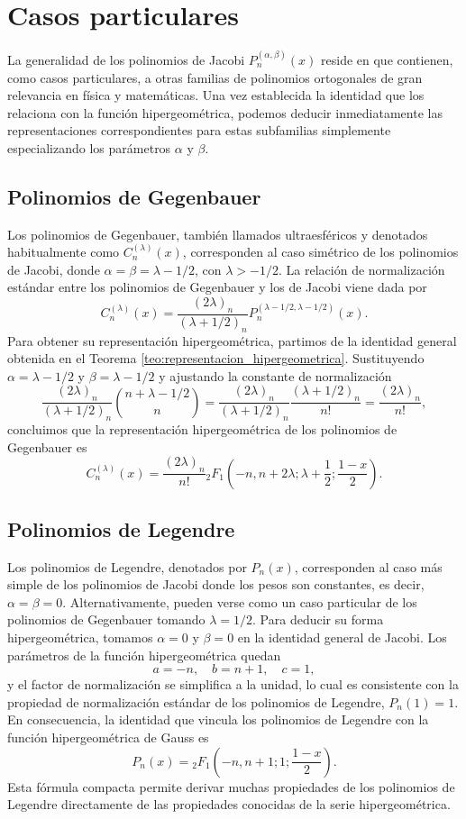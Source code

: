 \documentclass[12pt,a4paper]{book}
\begin{document}
\section{Casos particulares}
\label{sec:casos_particulares}

La generalidad de los polinomios de Jacobi $P_n^{(\alpha, \beta)}(x)$ reside en que contienen, como casos particulares, a otras familias de polinomios ortogonales de gran relevancia en física y matemáticas. Una vez establecida la identidad que los relaciona con la función hipergeométrica, podemos deducir inmediatamente las representaciones correspondientes para estas subfamilias simplemente especializando los parámetros $\alpha$ y $\beta$.

\subsection{Polinomios de Gegenbauer}

Los polinomios de Gegenbauer, también llamados ultraesféricos y denotados habitualmente como $C_n^{(\lambda)}(x)$, corresponden al caso simétrico de los polinomios de Jacobi, donde $\alpha = \beta = \lambda - 1/2$, con $\lambda > -1/2$.
La relación de normalización estándar entre los polinomios de Gegenbauer y los de Jacobi viene dada por
\[
    C_n^{(\lambda)}(x) = \frac{(2\lambda)_n}{(\lambda+1/2)_n} P_n^{(\lambda-1/2, \lambda-1/2)}(x).
\]
Para obtener su representación hipergeométrica, partimos de la identidad general obtenida en el Teorema \ref{teo:representacion_hipergeometrica}. Sustituyendo $\alpha = \lambda - 1/2$ y $\beta = \lambda - 1/2$ y ajustando la constante de normalización
\[
\frac{(2\lambda)_n}{(\lambda+1/2)_n} \binom{n+\lambda-1/2}{n} = \frac{(2\lambda)_n}{(\lambda+1/2)_n} \frac{(\lambda+1/2)_n}{n!} = \frac{(2\lambda)_n}{n!},
\]
concluimos que la representación hipergeométrica de los polinomios de Gegenbauer es
\[
C_n^{(\lambda)}(x) = \frac{(2\lambda)_n}{n!} {}_{2}F_{1}\left(-n, n+2\lambda; \lambda+\frac{1}{2}; \frac{1-x}{2}\right).
\]

\subsection{Polinomios de Legendre}

Los polinomios de Legendre, denotados por $P_n(x)$, corresponden al caso más simple de los polinomios de Jacobi donde los pesos son constantes, es decir, $\alpha = \beta = 0$.
Alternativamente, pueden verse como un caso particular de los polinomios de Gegenbauer tomando $\lambda = 1/2$.
Para deducir su forma hipergeométrica, tomamos $\alpha = 0$ y $\beta = 0$ en la identidad general de Jacobi. Los parámetros de la función hipergeométrica quedan
    \[
    a = -n, \quad b = n+1, \quad c = 1,
    \]
y el factor de normalización se simplifica a la unidad, lo cual es consistente con la propiedad de normalización estándar de los polinomios de Legendre, $P_n(1) = 1$.
En consecuencia, la identidad que vincula los polinomios de Legendre con la función hipergeométrica de Gauss es
\[
P_n(x) = {}_{2}F_{1}\left(-n, n+1; 1; \frac{1-x}{2}\right).
\]
Esta fórmula compacta permite derivar muchas propiedades de los polinomios de Legendre directamente de las propiedades conocidas de la serie hipergeométrica.
\end{document}

